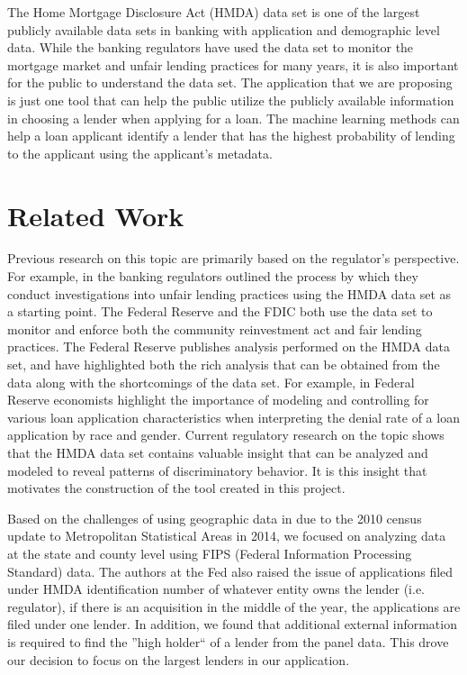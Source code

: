 \documentclass[conference,compsoc]{IEEEtran}
\begin{document}
The Home Mortgage Disclosure Act (HMDA) data set is one of the largest publicly available data sets in banking with application and demographic level data.  While the banking regulators have used the data set to monitor the mortgage market and unfair lending practices for many years, it is also important for the public to understand the data set.  The application that we are proposing is just one tool that can help the public utilize the publicly available information in choosing a lender when applying for a loan.  The machine learning methods can help a loan applicant identify a lender that has the highest probability of lending to the applicant using the applicant’s metadata.  


\section{Related Work}

Previous research on this topic are primarily based on the regulator’s perspective.  For example, in \cite{FDIC} the banking regulators outlined the process by which they conduct investigations into unfair lending practices using the HMDA data set as a starting point.  The Federal Reserve and the FDIC both use the data set to monitor and enforce both the community reinvestment act and fair lending practices. 
The Federal Reserve publishes analysis performed on the HMDA data set, and have highlighted both the rich analysis that can be obtained from the data along with the shortcomings of the data set.  For example, in \cite{FED} Federal Reserve economists highlight the importance of modeling and controlling for various loan application characteristics when interpreting the denial rate of a loan application by race and gender. 
Current regulatory research on the topic shows that the HMDA data set contains valuable insight that can be analyzed and modeled to reveal patterns of discriminatory behavior. It is this insight that motivates the construction of the tool created in this project.

Based on the challenges of using geographic data in \cite{FED} due to the 2010 census update to Metropolitan Statistical Areas in 2014, we focused on analyzing data at the state and county level using FIPS (Federal Information Processing Standard) data.  The authors at the Fed \cite{FED} also raised the issue of applications filed under HMDA identification number of whatever entity owns the lender (i.e. regulator), if there is an acquisition in the middle of the year, the applications are filed under one lender.  In addition, we found that additional external information is required to find the ''high holder`` of a lender from the panel data.  This drove our decision to focus on the largest lenders in our application.  
\end{document}
